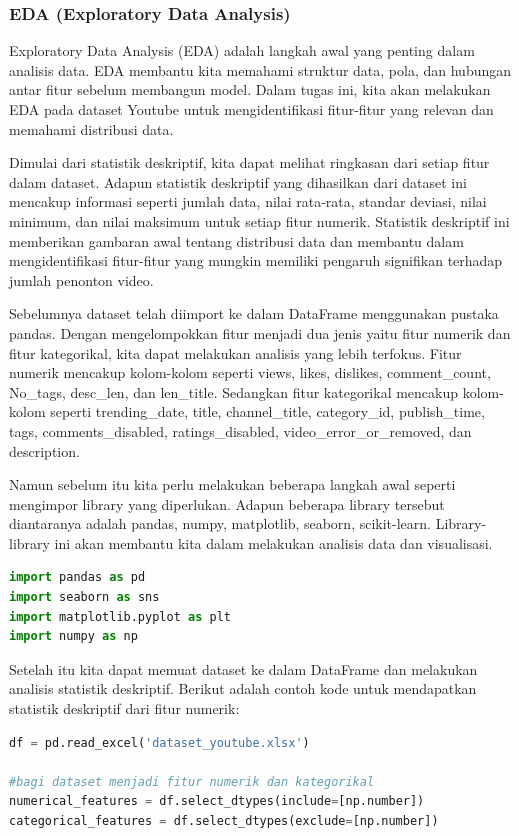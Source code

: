 \subsubsection{EDA (Exploratory Data Analysis)}
Exploratory Data Analysis (EDA) adalah langkah awal yang penting dalam analisis data. EDA membantu kita memahami struktur data, pola, dan hubungan antar fitur sebelum membangun model. Dalam tugas ini, kita akan melakukan EDA pada dataset Youtube untuk mengidentifikasi fitur-fitur yang relevan dan memahami distribusi data.

Dimulai dari statistik deskriptif, kita dapat melihat ringkasan dari setiap fitur dalam dataset. Adapun statistik deskriptif yang dihasilkan dari dataset ini mencakup informasi seperti jumlah data, nilai rata-rata, standar deviasi, nilai minimum, dan nilai maksimum untuk setiap fitur numerik. Statistik deskriptif ini memberikan gambaran awal tentang distribusi data dan membantu dalam mengidentifikasi fitur-fitur yang mungkin memiliki pengaruh signifikan terhadap jumlah penonton video.

Sebelumnya dataset telah diimport ke dalam DataFrame menggunakan pustaka pandas. Dengan mengelompokkan fitur menjadi dua jenis yaitu fitur numerik dan fitur kategorikal, kita dapat melakukan analisis yang lebih terfokus. Fitur numerik mencakup kolom-kolom seperti views, likes, dislikes, comment\_count, No\_tags, desc\_len, dan len\_title. Sedangkan fitur kategorikal mencakup kolom-kolom seperti trending\_date, title, channel\_title, category\_id, publish\_time, tags, comments\_disabled, ratings\_disabled, video\_error\_or\_removed, dan description.

Namun sebelum itu kita perlu melakukan beberapa langkah awal seperti mengimpor library yang diperlukan. Adapun beberapa library tersebut diantaranya adalah pandas, numpy, matplotlib, seaborn, scikit-learn. Library-library ini akan membantu kita dalam melakukan analisis data dan visualisasi.

\begin{lstlisting}[language=Python, caption=Statistik Deskriptif Fitur Numerik]
import pandas as pd
import seaborn as sns
import matplotlib.pyplot as plt
import numpy as np
\end{lstlisting}

Setelah itu kita dapat memuat dataset ke dalam DataFrame dan melakukan analisis statistik deskriptif. Berikut adalah contoh kode untuk mendapatkan statistik deskriptif dari fitur numerik:

\begin{lstlisting}[language=Python, caption=Statistik Deskriptif Fitur Numerik]
df = pd.read_excel('dataset_youtube.xlsx')

#bagi dataset menjadi fitur numerik dan kategorikal
numerical_features = df.select_dtypes(include=[np.number])
categorical_features = df.select_dtypes(exclude=[np.number])
\end{lstlisting}

